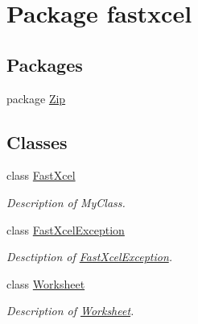 \hypertarget{namespacefastxcel}{
\section{Package fastxcel}
\label{namespacefastxcel}
}
\subsection*{Packages}
\begin{DoxyCompactItemize}
\item 
package \hyperlink{namespacefastxcel_1_1_zip}{Zip}
\end{DoxyCompactItemize}
\subsection*{Classes}
\begin{DoxyCompactItemize}
\item 
class \hyperlink{classfastxcel_1_1_fast_xcel}{FastXcel}
\begin{DoxyCompactList}\small\item\em Description of MyClass. \item\end{DoxyCompactList}\item 
class \hyperlink{classfastxcel_1_1_fast_xcel_exception}{FastXcelException}
\begin{DoxyCompactList}\small\item\em Desctiption of \hyperlink{classfastxcel_1_1_fast_xcel_exception}{FastXcelException}. \item\end{DoxyCompactList}\item 
class \hyperlink{classfastxcel_1_1_worksheet}{Worksheet}
\begin{DoxyCompactList}\small\item\em Description of \hyperlink{classfastxcel_1_1_worksheet}{Worksheet}. \item\end{DoxyCompactList}\end{DoxyCompactItemize}
